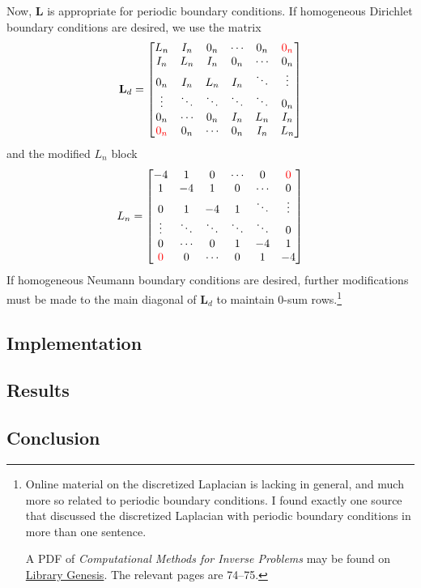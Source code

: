 Now, $\mathbf L$ is appropriate for periodic boundary conditions.
If homogeneous Dirichlet boundary conditions are desired, we use the matrix
\begin{equation}
    \mathbf L_d = \begin{bmatrix}
        L_n              & I_n    & 0_n    & \cdots & 0_n    & \color{red}{0_n} \\
        I_n              & L_n    & I_n    & 0_n    & \cdots & 0_n              \\
        0_n              & I_n    & L_n    & I_n    & \ddots & \vdots           \\
        \vdots           & \ddots & \ddots & \ddots & \ddots & 0_n              \\
        0_n              & \cdots & 0_n    & I_n    & L_n    & I_n              \\
        \color{red}{0_n} & 0_n    & \cdots & 0_n    & I_n    & L_n
    \end{bmatrix}
\end{equation}
and the modified $L_n$ block
\begin{equation}
    L_n = \begin{bmatrix}
        -4             & 1      & 0      & \cdots & 0      & \color{red}{0} \\
        1              & -4     & 1      & 0      & \cdots & 0              \\
        0              & 1      & -4     & 1      & \ddots & \vdots         \\
        \vdots         & \ddots & \ddots & \ddots & \ddots & 0              \\
        0              & \cdots & 0      & 1      & -4     & 1              \\
        \color{red}{0} & 0      & \cdots & 0      & 1      & -4
    \end{bmatrix}
\end{equation}
If homogeneous Neumann boundary conditions are desired, further modifications must be made to the main diagonal of $\mathbf L_d$ to maintain 0-sum rows.\footnote{
    Online material on the discretized Laplacian is lacking in general, and much more so related to periodic boundary conditions.
    I found exactly one source that discussed the discretized Laplacian with periodic boundary conditions in more than one sentence.

    A PDF of \textit{Computational Methods for Inverse Problems} may be found on \href{http://booksdescr.org/item/index.php?md5=6DF2AA596DDBE34BCF9354A5626B75DA}{Library Genesis}.
    The relevant pages are 74--75.
}

\subsection{Implementation}
\subsection{Results}
\subsection{Conclusion}
